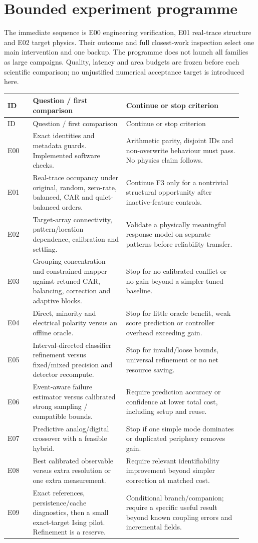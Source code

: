 \section{Bounded experiment programme}

The immediate sequence is E00 engineering verification, E01 real-trace structure and
E02 target physics. Their outcome and full closest-work inspection select one main
intervention and one backup. The programme does not launch all families as large campaigns.
Quality, latency and area budgets are frozen before each scientific comparison; no
unjustified numerical acceptance target is introduced here.

\small
\begin{longtable}{@{}p{0.10\linewidth}p{0.37\linewidth}p{0.46\linewidth}@{}}
\toprule ID & Question / first comparison & Continue or stop criterion\\\midrule\endfirsthead
\toprule ID & Question / first comparison & Continue or stop criterion\\\midrule\endhead
E00 & Exact identities and metadata guards. Implemented software checks. & Arithmetic parity, disjoint IDs and non-overwrite behaviour must pass. No physics claim follows.\\
E01 & Real-trace occupancy under original, random, zero-rate, balanced, CAR and quiet-balanced orders. & Continue F3 only for a nontrivial structural opportunity after inactive-feature controls.\\
E02 & Target-array connectivity, pattern/location dependence, calibration and settling. & Validate a physically meaningful response model on separate patterns before reliability transfer.\\
E03 & Grouping concentration and constrained mapper against retuned CAR, balancing, correction and adaptive blocks. & Stop for no calibrated conflict or no gain beyond a simpler tuned baseline.\\
E04 & Direct, minority and electrical polarity versus an offline oracle. & Stop for little oracle benefit, weak score prediction or controller overhead exceeding gain.\\
E05 & Interval-directed classifier refinement versus fixed/mixed precision and detector recompute. & Stop for invalid/loose bounds, universal refinement or no net resource saving.\\
E06 & Event-aware failure estimator versus calibrated strong sampling / compatible bounds. & Require prediction accuracy or confidence at lower total cost, including setup and reuse.\\
E07 & Predictive analog/digital crossover with a feasible hybrid. & Stop if one simple mode dominates or duplicated periphery removes gain.\\
E08 & Best calibrated observable versus extra resolution or one extra measurement. & Require relevant identifiability improvement beyond simpler correction at matched cost.\\
E09 & Exact references, persistence/cache diagnostics, then a small exact-target Ising pilot. Refinement is a reserve. & Conditional branch/companion; require a specific useful result beyond known coupling errors and incremental fields.\\\bottomrule
\end{longtable}
